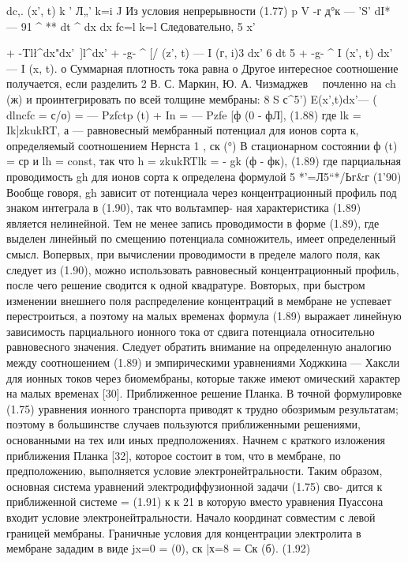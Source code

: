  
dc,. (x', t)
k	’ Л„'
k=i J
Из условия непрерывности (1.77)
p V -г	д°к	—	'S'	dI*	—	91
^	**	dt	^	dx	dx
fc=l	k=l
Следовательно,
5 x' 

 
+ -Tl\l^dx"dx'~]l^dx’
+ -g- ^ [/ (z', t) — I (г, i)3 dx'
6 dt
5
+ -g- ^ I (x', t) dx' — I (x, t). о
Суммарная плотность тока равна
о
Другое интересное соотношение получается, если разделить
2 В. С. Маркин, Ю. А. Чизмаджев 
почленно на ch (ж) и проинтегрировать по всей толщине мембраны:
8	S	с^5')
E(x',t)dx'— ( dlncfc = с/о)
= — Pzfctp (t) + In = — Pzfe [ф (0 - фЛ], (1.88)
где lk = Ik]zkukRT, а — равновесный мембранный потенциал для ионов сорта к, определяемый соотношением Нернста
1 , ск (°)
В стационарном состоянии ф (t) = ср и lh = const, так что
h = zkukRTlk = - gk (ф - фк),	(1.89)
где парциальная проводимость gh для ионов сорта к определена формулой
5
*'=Л5“*/Ьг&г	(1'90)
Вообще говоря, gh зависит от потенциала через концентрационный профиль под знаком интеграла в (1.90), так что вольтампер- ная характеристика (1.89) является нелинейной. Тем не менее запись проводимости в форме (1.89), где выделен линейный по смещению потенциала сомножитель, имеет определенный смысл. Вопервых, при вычислении проводимости в пределе малого поля, как следует из (1.90), можно использовать равновесный концентрационный профиль, после чего решение сводится к одной квадратуре. Вовторых, при быстром изменении внешнего поля распределение концентраций в мембране не успевает перестроиться, а поэтому на малых временах формула (1.89) выражает линейную зависимость парциального ионного тока от сдвига потенциала относительно равновесного значения. Следует обратить внимание на определенную аналогию между соотношением (1.89) и эмпирическими уравнениями Ходжкина — Хаксли для ионных токов через биомембраны, которые также имеют омический характер на малых временах [30].
Приближенное решение Планка. В точной формулировке (1.75) уравнения ионного транспорта приводят к трудно обозримым результатам; поэтому в большинстве случаев пользуются приближенными решениями, основанными на тех или иных предположениях.
Начнем с краткого изложения приближения Планка [32], которое состоит в том, что в мембране, по предположению, выполняется условие электронейтральности. Таким образом, основная система уравнений электродиффузионной задачи (1.75) сво- 
дится к приближенной системе
=	(1.91)
к к
21 %
в которую вместо уравнения Пуассона входит условие электронейтральности. Начало координат совместим с левой границей мембраны. Граничные условия для концентрации электролита в мембране зададим в виде
jx=0 =	(0), ск |х=8 = Ск (б).	(1.92)
